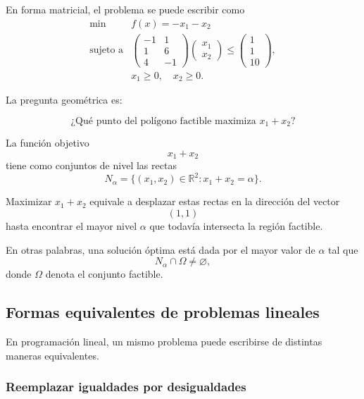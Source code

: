 En forma matricial, el problema se puede escribir como
\[
    \begin{array}{ll}
        \min & f(x)=-x_1-x_2\\[1mm]
        \text{sujeto a}
        &
        \begin{pmatrix}
            -1 & 1\\
            1 & 6\\
            4 & -1
        \end{pmatrix}
        \begin{pmatrix}
            x_1\\
            x_2
        \end{pmatrix}
        \leq
        \begin{pmatrix}
            1\\
            1\\
            10
        \end{pmatrix},
        \\[6mm]
        & x_1\geq 0,\quad x_2\geq 0.
    \end{array}
\]

La pregunta geométrica es:

\[
    \text{¿Qué punto del polígono factible maximiza } x_1+x_2?
\]

La función objetivo
\[
    x_1+x_2
\]
tiene como conjuntos de nivel las rectas
\[
    N_\alpha
    =
    \{(x_1,x_2)\in\mathbb{R}^2:x_1+x_2=\alpha\}.
\]

Maximizar \(x_1+x_2\) equivale a desplazar estas rectas en la dirección del vector
\[
    (1,1)
\]
hasta encontrar el mayor nivel \(\alpha\) que todavía intersecta la región factible.

En otras palabras, una solución óptima está dada por el mayor valor de \(\alpha\) tal que
\[
    N_\alpha\cap \Omega\neq\varnothing,
\]
donde \(\Omega\) denota el conjunto factible.

\subsection{Formas equivalentes de problemas lineales}

En programación lineal, un mismo problema puede escribirse de distintas maneras equivalentes.

\subsubsection{Reemplazar igualdades por desigualdades}

